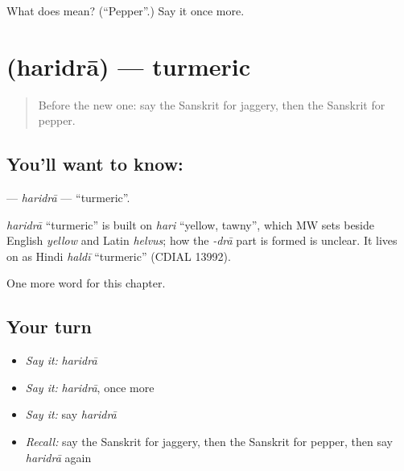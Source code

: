 \begin{tcolorbox}[breakable,colback=teal!4,colframe=teal!35!black,title={Before you move on}]
What does  mean? (\textquotedblleft{}Pepper\textquotedblright{}.) Say it once more.
\end{tcolorbox}
\section[\texorpdfstring{\sk{हरिद्रा} (haridrā)}{हरिद्रा (haridrā)}]{ (haridrā) — turmeric}

\label{lesson:SA-C107-haridra}



\begin{quote}
Before the new one: say the Sanskrit for jaggery, then the Sanskrit for pepper.
\end{quote}

\subsection*{You'll want to know: }
\textbf{} — \emph{haridrā} — \textquotedblleft{}turmeric\textquotedblright{}.

\begin{cousinweb}
\emph{haridrā} \textquotedblleft{}turmeric\textquotedblright{} is built on \emph{hari} \textquotedblleft{}yellow, tawny\textquotedblright{}, which MW sets beside English \emph{yellow} and Latin \emph{helvus}; how the \emph{-drā} part is formed is unclear. It lives on as Hindi \emph{haldī} \textquotedblleft{}turmeric\textquotedblright{} (CDIAL 13992).
\end{cousinweb}

\begin{grammarlens}[title={What you've built}]
One more word for this chapter.
\end{grammarlens}

\subsection*{Your turn}
\begin{itemize}
\raggedright
  \item \emph{Say it:} \emph{haridrā}
  \item \emph{Say it:} \emph{haridrā}, once more
  \item \emph{Say it:} say \emph{haridrā}
  \item \emph{Recall:} say the Sanskrit for jaggery, then the Sanskrit for pepper, then say \emph{haridrā} again
\end{itemize}

